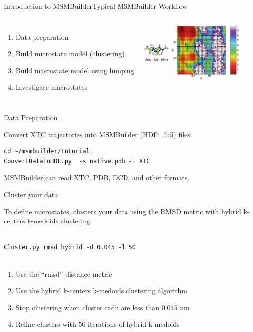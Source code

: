 \documentclass[10pt]{beamer}
\begin{document}
\begin{frame}{Introduction to MSMBuilder}{Typical MSMBuilder Workflow}

\begin{columns}
 
 \column{7cm}
 
\begin{enumerate}
 \item Data preparation
 \item Build microstate model (clustering)
 \item Build macrostate model using lumping
 \item Investigate macrostates
\end{enumerate}

\column{5cm}

\includegraphics[width=5.0cm]{Figures/chodera}

\end{columns}

\end{frame}

\begin{frame}[fragile]{Data Preparation}
 
Convert XTC trajectories into MSMBuilder (HDF: .lh5) files:


\vfill

\begin{verbatim}
cd ~/msmbuilder/Tutorial
ConvertDataToHDF.py  -s native.pdb -i XTC
\end{verbatim}

\vfill

MSMBuilder can read XTC, PDB, DCD, and other formats.   
 
\end{frame}

\begin{frame}[fragile]{Cluster your data}

To define microstates, clusters your data using the RMSD metric with hybrid k-centers k-medoids clustering.

\begin{verbatim}
 
Cluster.py rmsd hybrid -d 0.045 -l 50
 
\end{verbatim}

\begin{enumerate}
 \item Use the ``rmsd'' distance metric
 \item Use the hybrid k-centers k-medoids clustering algorithm
 \item Stop clustering when cluster radii are less than 0.045 nm
 \item Refine clusters with 50 iterations of hybrid k-medoids
\end{enumerate}
 
\end{frame}
\end{document}
